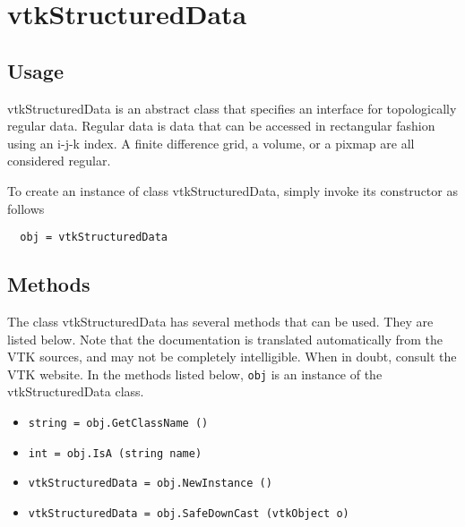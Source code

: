 \section{vtkStructuredData}

\subsection{Usage}

 vtkStructuredData is an abstract class that specifies an interface for
 topologically regular data. Regular data is data that can be accessed
 in rectangular fashion using an i-j-k index. A finite difference grid,
 a volume, or a pixmap are all considered regular.

To create an instance of class vtkStructuredData, simply
invoke its constructor as follows
\begin{verbatim}
  obj = vtkStructuredData
\end{verbatim}
\subsection{Methods}

The class vtkStructuredData has several methods that can be used.
  They are listed below.
Note that the documentation is translated automatically from the VTK sources,
and may not be completely intelligible.  When in doubt, consult the VTK website.
In the methods listed below, \verb|obj| is an instance of the vtkStructuredData class.
\begin{itemize}
\item  \verb|string = obj.GetClassName ()|

\item  \verb|int = obj.IsA (string name)|

\item  \verb|vtkStructuredData = obj.NewInstance ()|

\item  \verb|vtkStructuredData = obj.SafeDownCast (vtkObject o)|

\end{itemize}
